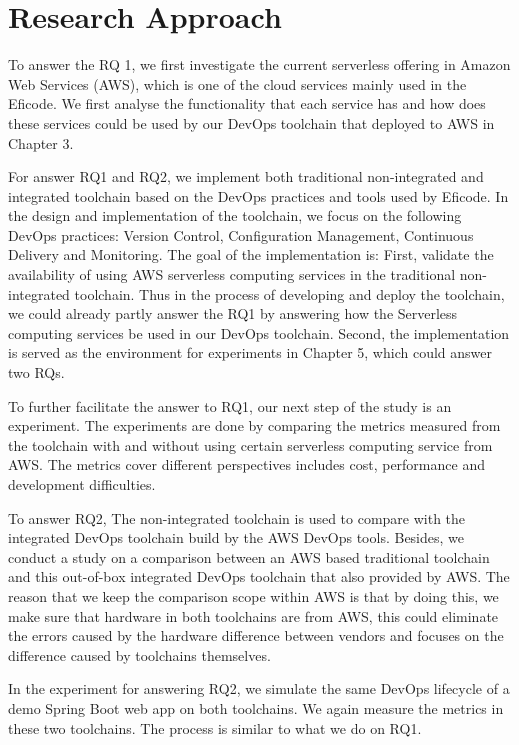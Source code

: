 \section{Research Approach} 
\par
To answer the RQ 1, we first investigate the current serverless offering in Amazon Web Services (AWS), which is one of the cloud services mainly used in the Eficode. We first analyse the functionality that each service has and how does these services could be used by our DevOps toolchain that deployed to AWS in Chapter 3.
\par
For answer RQ1 and RQ2, we implement both traditional non-integrated and integrated toolchain based on the DevOps practices and tools used by Eficode. In the design and implementation of the toolchain, we focus on the following DevOps practices: Version Control, Configuration Management, Continuous Delivery and Monitoring. The goal of the implementation is: First, validate the availability of using AWS serverless computing services in the traditional non-integrated toolchain. Thus in the process of developing and deploy the toolchain, we could already partly answer the RQ1 by answering how the Serverless computing services be used in our DevOps toolchain. Second, the implementation is served as the environment for experiments in Chapter 5, which could answer two RQs.
\par
To further facilitate the answer to RQ1, our next step of the study is an experiment.
The experiments are done by comparing the metrics measured from the toolchain with and without using certain serverless computing service from AWS. The metrics cover different perspectives includes cost, performance and development difficulties. 
\par
To answer RQ2, The non-integrated toolchain is used to compare with the integrated DevOps toolchain build by the AWS DevOps tools.
Besides, we conduct a study on a comparison between an AWS based traditional toolchain and this out-of-box integrated DevOps toolchain that also provided by AWS. The reason that we keep the comparison scope within AWS is that by doing this, we make sure that hardware in both toolchains are from AWS, this could eliminate the errors caused by the hardware difference between vendors and focuses on the difference caused by toolchains themselves.
\par
In the experiment for answering RQ2, we simulate the same DevOps lifecycle of a demo Spring Boot web app on both toolchains. We again measure the metrics in these two toolchains. The process is similar to what we do on RQ1.
